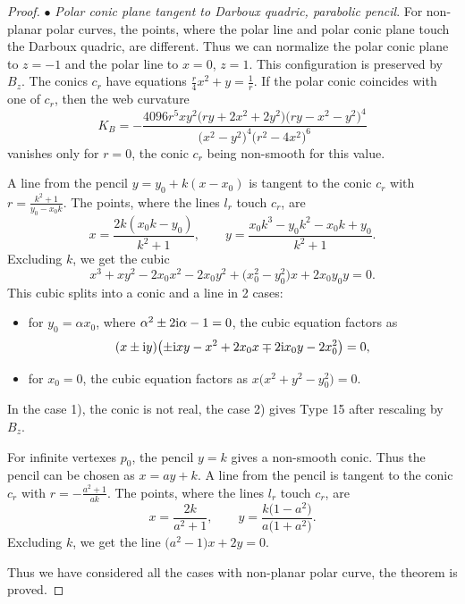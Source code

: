 \begin{proof}
$\bullet$ {\it Polar conic plane tangent to Darboux quadric, parabolic pencil}.
For non-planar polar curves, the points, where the polar line and polar conic plane touch the Darboux quadric, are different. Thus we can normalize the polar conic plane to $z=-1$ and the polar line to $x=0$, $z=1$. This configuration is preserved by $B_z$. The conics $c_r$ have equations
$
\frac{r}{4}x^2 + y =\frac{1}{r}$.
If the polar conic coincides with one of $c_r$, then the web curvature
\[
K_B=-\frac{4096r^5xy^2\bigl(ry + 2x^2 + 2y^2\bigr)\bigl(ry - x^2 - y^2\bigr)^4}{\bigl(x^2 - y^2\bigr)^4\bigl(r^2 - 4x^2\bigr)^6}
\]
vanishes only for $r=0$, the conic $c_r$ being non-smooth for this value.

 A line from the pencil $y=y_0+k(x-x_0)$ is tangent to the conic $c_r$ with
$
r=\frac{k^2+1}{y_0-x_0k}$.
 The points, where the lines $l_r$ touch $c_r$, are
\[
x=\frac{2k(x_0k - y_0)}{k^2 + 1},\qquad
y=\frac{x_0k^3 -y_0 k^2 -x_0 k + y_0}{k^2 + 1}.
\]
Excluding $k$, we get the cubic
\[
x^3+ xy^2 - 2x_0x^2- 2x_0y^2 + \bigl(x_0^2 - y_0^2\bigr)x + 2x_0y_0y=0.
\]
This cubic splits into a conic and a line in 2
 cases:
 \begin{itemize}
\item[(1)] for $y_0=\alpha x_0$, where $\alpha ^2 \pm 2{\rm i} \alpha -1=0$, the cubic equation factors as
\[
(x \pm {\rm i} y)\bigl(\pm {\rm i} xy -x^2 +2x_0x\mp 2{\rm i} x_0y - 2x_0^2\bigr)=0,
\]
\item[(2)] for $x_0=0$, the cubic equation factors as $x\bigl(x^2+y^2-y_0^2\bigr)=0$.
 \end{itemize}
 In the case 1), the conic is not real, the case 2) gives Type 15 after rescaling by $B_z$.

 For infinite vertexes $p_0$, the pencil $y=k$ gives a non-smooth conic. Thus the pencil can be chosen as $x=ay+k$. A line from the pencil is tangent to the conic $c_r$ with
$
r=-\frac{a^2+ 1}{ak}$.
 The points, where the lines $l_r$ touch $c_r$, are
\[
x=\frac{2k}{a^2+1}, \qquad y=\frac{k\bigl(1- a^2 \bigr)}{a\bigl(1+a^2\bigr)}.
\]
Excluding $k$, we get the line
$\bigl(a^2 - 1\bigr)x + 2y=0$.

 Thus we have considered all the cases with non-planar polar curve, the theorem is proved.
\end{proof}
